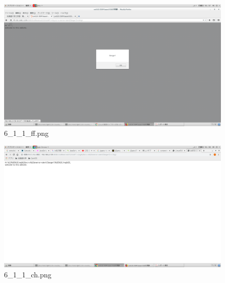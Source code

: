 \documentclass[a4j]{jarticle}
\begin{document}
  \vspace{1cm}
  \begin{figure}[htbp]
    \centering
    \includegraphics[width=13cm]{../webapp/png/6_1_1_ff.png}
    \caption{6\_1\_1\_ff.png}
  \end{figure}

  \vspace{1cm}
  \begin{figure}[htbp]
    \centering
    \includegraphics[width=13cm]{../webapp/png/6_1_1_ch.png}
    \caption{6\_1\_1\_ch.png}
  \end{figure}
\end{document}
